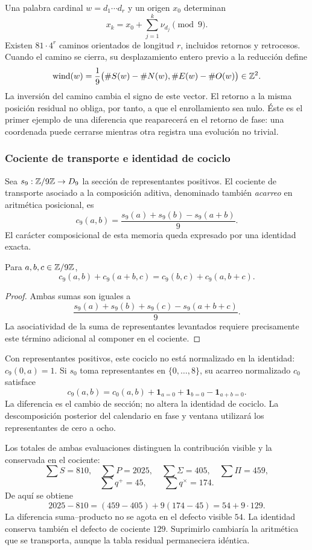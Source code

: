 Una palabra cardinal \(w=d_1\cdots d_r\) y un origen \(x_0\) determinan
\[
 x_k=x_0+\sum_{j=1}^k\nu_{d_j}\pmod9.
\]
Existen \(81\cdot4^r\) caminos orientados de longitud \(r\), incluidos retornos y retrocesos. Cuando el camino se cierra, su desplazamiento entero previo a la reducción define
\begin{equation}
 \operatorname{wind}(w)=\frac19
 \bigl(\#S(w)-\#N(w),\#E(w)-\#O(w)\bigr)\in\mathbb Z^2.
\end{equation}
La inversión del camino cambia el signo de este vector. El retorno a la misma posición residual no obliga, por tanto, a que el enrollamiento sea nulo. Éste es el primer ejemplo de una diferencia que reaparecerá en el retorno de fase: una coordenada puede cerrarse mientras otra registra una evolución no trivial.

\subsubsection{Cociente de transporte e identidad de cociclo}

Sea \(s_9:\mathbb Z/9\mathbb Z\to D_9\) la sección de representantes positivos. El cociente de transporte asociado a la composición aditiva, denominado también \emph{acarreo} en aritmética posicional, es
\[
 c_9(a,b)=\frac{s_9(a)+s_9(b)-s_9(a+b)}9.
\]
El carácter composicional de esta memoria queda expresado por una identidad exacta.

\begin{lemma}
Para \(a,b,c\in\mathbb Z/9\mathbb Z\),
\[
 c_9(a,b)+c_9(a+b,c)=c_9(b,c)+c_9(a,b+c).
\]
\end{lemma}
\begin{proof}
Ambas sumas son iguales a
\[
 \frac{s_9(a)+s_9(b)+s_9(c)-s_9(a+b+c)}9.
\]
La asociatividad de la suma de representantes levantados requiere precisamente este término adicional al componer en el cociente.
\end{proof}

Con representantes positivos, este cociclo no está normalizado en la identidad: \(c_9(0,a)=1\). Si \(s_0\) toma representantes en \(\{0,\ldots,8\}\), su acarreo normalizado \(c_0\) satisface
\[
 c_9(a,b)=c_0(a,b)+\mathbf1_{a=0}+\mathbf1_{b=0}-\mathbf1_{a+b=0}.
\]
La diferencia es el cambio de sección; no altera la identidad de cociclo. La descomposición posterior del calendario en fase y ventana utilizará los representantes de cero a ocho.

Los totales de ambas evaluaciones distinguen la contribución visible y la conservada en el cociente:
\[
 \sum S=810,\quad\sum P=2025,\quad
 \sum\Sigma=405,\quad\sum\Pi=459,
\]
\[
 \sum q^+=45,\qquad\sum q^\times=174.
\]
De aquí se obtiene
\begin{equation}
 2025-810=(459-405)+9(174-45)=54+9\cdot129.
 \label{eq:defecto-integrado}
\end{equation}
La diferencia suma--producto no se agota en el defecto visible \(54\). La identidad conserva también el defecto de cociente \(129\). Suprimirlo cambiaría la aritmética que se transporta, aunque la tabla residual permaneciera idéntica.

